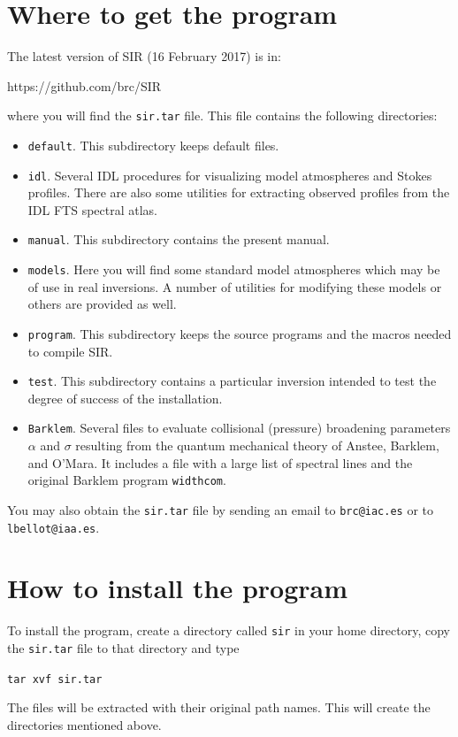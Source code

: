 \section{Where to get the program}
The latest version of SIR (16 February 2017) is in:

\begin{center}
https://github.com/brc/SIR
\end{center}
where you will find the {\tt sir.tar} file. This file contains the following 
directories: 

\begin{itemize}
\item {\tt default}. This subdirectory keeps default files. 
\item {\tt idl}. Several IDL procedures for visualizing model atmospheres
and Stokes profiles. There are also some utilities for extracting observed
profiles from the IDL FTS spectral atlas.
\item {\tt manual}. This subdirectory contains the present manual.
\item {\tt models}. Here you will find some standard model atmospheres
which may be of use in real inversions. A number of utilities for modifying
these models or others are provided as well.
\item {\tt program}. This subdirectory keeps the source programs and the
macros needed to compile SIR.
\item {\tt test}. This subdirectory contains a particular inversion intended
to test the degree of success of the installation. 
\item {\tt Barklem}. Several files to evaluate collisional (pressure) broadening parameters
$\alpha$  and $\sigma$ resulting from the quantum mechanical theory of Anstee, Barklem, and O'Mara.
It includes a file with a large list of spectral lines and the original Barklem program
{\tt widthcom}.

\end{itemize}
\begin{flushleft}
You may also obtain the {\tt sir.tar} file by sending an email to
{\tt brc@iac.es} or to {\tt lbellot@iaa.es}.
\end{flushleft}

\section{How to install the program}
To install the program, create a directory called {\tt sir} in your home
directory, copy the {\tt sir.tar} file to that directory and type
\begin{flushleft}
{\tt tar xvf sir.tar}
\end{flushleft}
The files will be extracted with their original path names. This will
create the directories mentioned above.

